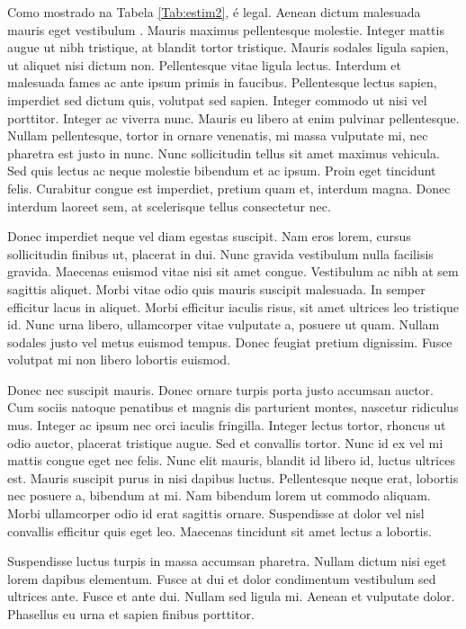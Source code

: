 \documentclass[book,A4paper,10pt,twoside,oldfontcommands]{memoir}\usepackage[]{graphicx}\usepackage[usenames,dvipsnames]{color}
\begin{document}
\begin{btUnit}
Como mostrado na Tabela \ref{Tab:estim2}, é legal. Aenean dictum
malesuada mauris eget vestibulum \citep{Cockerham1996}. Mauris maximus
pellentesque molestie. Integer mattis augue ut nibh tristique, at
blandit tortor tristique. Mauris sodales ligula sapien, ut aliquet
nisi dictum non. Pellentesque vitae ligula lectus. Interdum et
malesuada fames ac ante ipsum primis in faucibus. Pellentesque lectus
sapien, imperdiet sed dictum quis, volutpat sed sapien. Integer
commodo ut nisi vel porttitor. Integer ac viverra nunc. Mauris eu
libero at enim pulvinar pellentesque. Nullam pellentesque, tortor in
ornare venenatis, mi massa vulputate mi, nec pharetra est justo in
nunc. Nunc sollicitudin tellus sit amet maximus vehicula. Sed quis
lectus ac neque molestie bibendum et ac ipsum. Proin eget tincidunt
felis. Curabitur congue est imperdiet, pretium quam et, interdum
magna. Donec interdum laoreet sem, at scelerisque tellus consectetur
nec.


Donec imperdiet neque vel diam egestas suscipit. Nam eros lorem,
cursus sollicitudin finibus ut, placerat in dui. Nunc gravida
vestibulum nulla facilisis gravida. Maecenas euismod vitae nisi sit
amet congue. Vestibulum ac nibh at sem sagittis aliquet. Morbi vitae
odio quis mauris suscipit malesuada. In semper efficitur lacus in
aliquet. Morbi efficitur iaculis risus, sit amet ultrices leo
tristique id. Nunc urna libero, ullamcorper vitae vulputate a, posuere
ut quam. Nullam sodales justo vel metus euismod tempus. Donec feugiat
pretium dignissim. Fusce volutpat mi non libero lobortis euismod.


Donec nec suscipit mauris. Donec ornare turpis porta justo accumsan
auctor. Cum sociis natoque penatibus et magnis dis parturient montes,
nascetur ridiculus mus. Integer ac ipsum nec orci iaculis fringilla.
Integer lectus tortor, rhoncus ut odio auctor, placerat tristique
augue. Sed et convallis tortor. Nunc id ex vel mi mattis congue eget
nec felis. Nunc elit mauris, blandit id libero id, luctus ultrices
est. Mauris suscipit purus in nisi dapibus luctus. Pellentesque neque
erat, lobortis nec posuere a, bibendum at mi. Nam bibendum lorem ut
commodo aliquam. Morbi ullamcorper odio id erat sagittis ornare.
Suspendisse at dolor vel nisl convallis efficitur quis eget leo.
Maecenas tincidunt sit amet lectus a lobortis.

Suspendisse luctus turpis in massa accumsan pharetra. Nullam dictum
nisi eget lorem dapibus elementum. Fusce at dui et dolor condimentum
vestibulum sed ultrices ante. Fusce et ante dui. Nullam sed ligula mi.
Aenean et vulputate dolor. Phasellus eu urna et sapien finibus
porttitor.



\end{btUnit}
\end{document}
